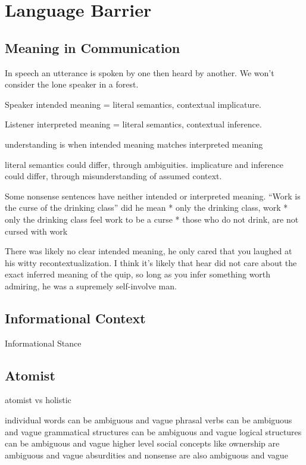 \chapter{Language Barrier}

\section{Meaning in Communication}
In speech an utterance is spoken by one then heard by another. We won't consider the lone speaker in a forest.

Speaker
intended meaning = literal semantics, contextual implicature.

Listener
interpreted meaning = literal semantics, contextual inference.

understanding is when intended meaning matches interpreted meaning

literal semantics could differ, through ambiguities.
implicature and inference could differ, through misunderstanding of assumed context.

Some nonsense sentences have neither intended or interpreted meaning.
``Work is the curse of the drinking class''
did he mean
* only the drinking class, work
* only the drinking class feel work to be a curse
* those who do not drink, are not cursed with work
 
There was likely no clear intended meaning, he only cared that you laughed at his witty recontextualization. I think it's likely that hear did not care about the exact inferred meaning of the quip, so long as you infer something worth admiring, he was a supremely self-involve man.


\section{Informational Context}
Informational Stance



\section{Atomist}
atomist vs holistic

individual words can be ambiguous and vague
phrasal verbs can be ambiguous and vague
grammatical structures can be ambiguous and vague
logical structures can be ambiguous and vague
higher level social concepts like ownership are ambiguous and vague
absurdities and nonsense are also ambiguous and vague